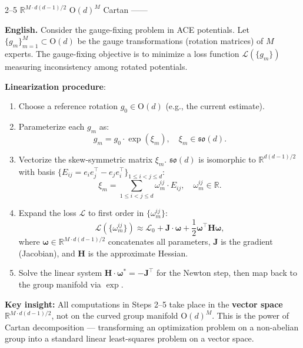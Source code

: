 \documentclass[11pt,a4paper]{article}
\theoremstyle{plain}
\theoremstyle{definition}
\theoremstyle{remark}
\newcommand{\R}{\mathbb{R}}
\newcommand{\so}{\mathfrak{so}}
\begin{document}
\textbf{}  2--5 \textbf{}
$\R^{M \cdot d(d-1)/2}$  $\mathrm{O}(d)^M$ 
 Cartan ——


\medskip
\noindent
\textbf{English.}
Consider the gauge-fixing problem in ACE potentials. Let
$\{g_m\}_{m=1}^M \subset \mathrm{O}(d)$ be the gauge transformations
(rotation matrices) of $M$ experts. The gauge-fixing objective is to
minimize a loss function $\mathcal{L}(\{g_m\})$ measuring inconsistency
among rotated potentials.

\textbf{Linearization procedure}:

\begin{enumerate}[label=\textbf{Step \arabic*}:, leftmargin=*]
  \item Choose a reference rotation $g_0 \in \mathrm{O}(d)$ (e.g., the current estimate).
  \item Parameterize each $g_m$ as:
        \begin{equation}
          g_m = g_0 \cdot \exp(\xi_m), \quad \xi_m \in \so(d).
        \end{equation}
  \item Vectorize the skew-symmetric matrix $\xi_m$. $\so(d)$ is isomorphic to
        $\R^{d(d-1)/2}$ with basis
        $\{E_{ij} = e_i e_j^\top - e_j e_i^\top\}_{1 \leq i < j \leq d}$:
        \begin{equation}
          \xi_m = \sum_{1 \leq i < j \leq d} \omega_m^{ij} \cdot E_{ij},
          \quad \omega_m^{ij} \in \R.
        \end{equation}
  \item Expand the loss $\mathcal{L}$ to first order in $\{\omega_m^{ij}\}$:
        \begin{equation}
          \mathcal{L}(\{\omega_m^{ij}\}) \approx
          \mathcal{L}_0 + \mathbf{J} \cdot \bm{\omega} + \frac{1}{2} \bm{\omega}^\top \mathbf{H} \bm{\omega},
        \end{equation}
        where $\bm{\omega} \in \R^{M \cdot d(d-1)/2}$ concatenates all parameters,
        $\mathbf{J}$ is the gradient (Jacobian), and $\mathbf{H}$ is the approximate Hessian.
  \item Solve the linear system $\mathbf{H} \cdot \bm{\omega}^* = -\mathbf{J}^\top$
        for the Newton step, then map back to the group manifold via $\exp$.
\end{enumerate}

\textbf{Key insight:} All computations in Steps 2--5 take place in the
\textbf{vector space} $\R^{M \cdot d(d-1)/2}$, not on the curved group
manifold $\mathrm{O}(d)^M$. This is the power of Cartan decomposition —
transforming an optimization problem on a non-abelian group into a standard
linear least-squares problem on a vector space.
\end{document}
